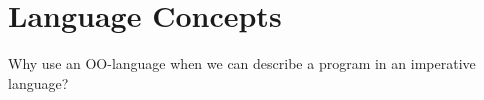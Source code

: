 \section{Language Concepts}
\lstset{language=C}
Why use an OO-language when we can describe a program in an imperative language?

